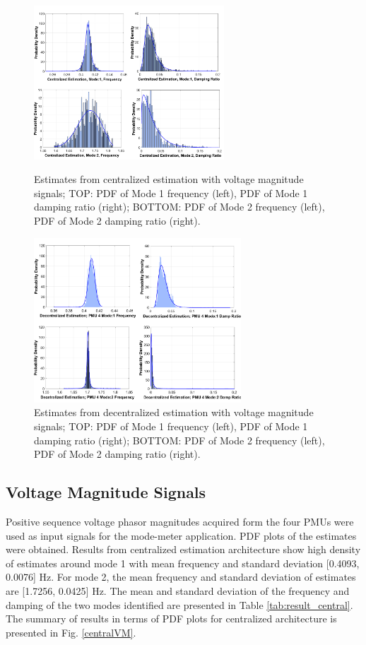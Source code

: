 \documentclass[conference]{IEEEtran}
\begin{document}
\begin{figure}[!t]
\centering
\begin{minipage}[b]{.45\textwidth}
\includegraphics[trim=.5in .1in .5in .1in,width=2.8in]{Central_VM}
\caption{Estimates from centralized estimation with voltage magnitude signals; TOP: PDF of Mode 1 frequency (left), PDF of Mode 1 damping ratio (right); BOTTOM: PDF of Mode 2 frequency (left), PDF of Mode 2 damping ratio (right).}\label{centralVM}
\end{minipage}\qquad
\begin{minipage}[b]{.45\textwidth}
\includegraphics[trim=.1in .1in .1in .1in,width=3.05in]{Decentral_VM}
\caption{Estimates from decentralized estimation with voltage magnitude signals; TOP: PDF of Mode 1 frequency (left), PDF of Mode 1 damping ratio (right); BOTTOM: PDF of Mode 2 frequency (left), PDF of Mode 2 damping ratio (right).}\label{decentralVM}
\end{minipage}
\end{figure}

\subsection{Voltage Magnitude Signals}
\vspace{-0.2em}
Positive sequence voltage phasor magnitudes acquired form the four PMUs were used as input signals for the mode-meter application. PDF plots of the estimates were obtained. Results from centralized estimation architecture show high density of estimates around mode 1 with mean frequency and standard deviation [0.4093, 0.0076] Hz. For mode 2, the mean frequency and standard deviation of estimates are [1.7256, 0.0425] Hz. The mean and standard deviation of the frequency and damping of the two modes identified are presented in Table \ref{tab:result_central}. The summary of results in terms of PDF plots for centralized architecture is presented in Fig. \ref{centralVM}.
\end{document}
